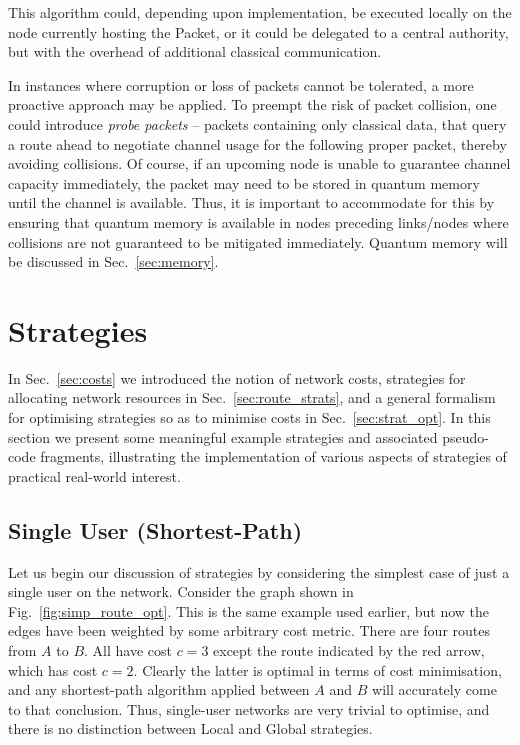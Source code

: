 \documentclass[aps,rmp,twocolumn,amsmath,amssymb,nofootinbib,superscriptaddress]{revtex4}
\begin{document}
This algorithm could, depending upon implementation, be executed locally on the node currently hosting the {\sc Packet}, or it could be delegated to a central authority, but with the overhead of additional classical communication.

In instances where corruption or loss of packets cannot be tolerated, a more proactive approach may be applied. To preempt the risk of packet collision, one could introduce \emph{probe packets} -- packets containing only classical data, that query a route ahead to negotiate channel usage for the following proper packet, thereby avoiding collisions. Of course, if an upcoming node is unable to guarantee channel capacity immediately, the packet may need to be stored in quantum memory until the channel is available. Thus, it is important to accommodate for this by ensuring that quantum memory is available in nodes preceding links/nodes where collisions are not guaranteed to be mitigated immediately. Quantum memory will be discussed in Sec.~\ref{sec:memory}.

%
%

\section{Strategies} \label{sec:strategies}

In Sec.~\ref{sec:costs} we introduced the notion of network costs, strategies for allocating network resources in Sec.~\ref{sec:route_strats}, and a general formalism for optimising strategies so as to minimise costs in Sec.~\ref{sec:strat_opt}. In this section we present some meaningful example strategies and associated pseudo-code fragments, illustrating the implementation of various aspects of strategies of practical real-world interest.

%
%

\subsection{Single User (Shortest-Path)} \label{sec:single_user_shortest}

Let us begin our discussion of strategies by considering the simplest case of just a single user on the network. Consider the graph shown in Fig.~\ref{fig:simp_route_opt}. This is the same example used earlier, but now the edges have been weighted by some arbitrary cost metric. There are four routes from $A$ to $B$. All have cost \mbox{$c=3$} except the route indicated by the red arrow, which has cost \mbox{$c=2$}. Clearly the latter is optimal in terms of cost minimisation, and any shortest-path algorithm applied between $A$ and $B$ will accurately come to that conclusion. Thus, single-user networks are very trivial to optimise, and there is no distinction between {\sc Local} and {\sc Global} strategies.
\end{document}
